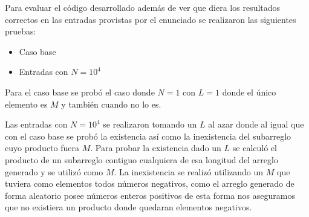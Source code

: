 Para evaluar el código desarrollado además de ver que diera los resultados
correctos en las entradas provistas por el enunciado se realizaron las
siguientes pruebas:

\begin{itemize}
	\item{Caso base}
	\item{Entradas con $N = 10^4$}
\end{itemize}

Para el caso base se probó el caso donde $N = 1$ con $L = 1$ donde el único
elemento es $M$ y también cuando no lo es.

Las entradas con $N = 10^4$ se realizaron tomando un $L$ al azar donde al igual
que con el caso base se probó la existencia así como la inexistencia del
subarreglo cuyo producto fuera $M$. Para probar la existencia dado un $L$ se
calculó el producto de un subarreglo contiguo cualquiera de esa longitud del
arreglo generado y se utilizó como $M$. La inexistencia se realizó utilizando un
$M$ que tuviera como elementos todos números negativos, como el arreglo generado
de forma aleatorio posee números enteros positivos de esta forma nos aseguramos
que no existiera un producto donde quedaran elementos negativos.
